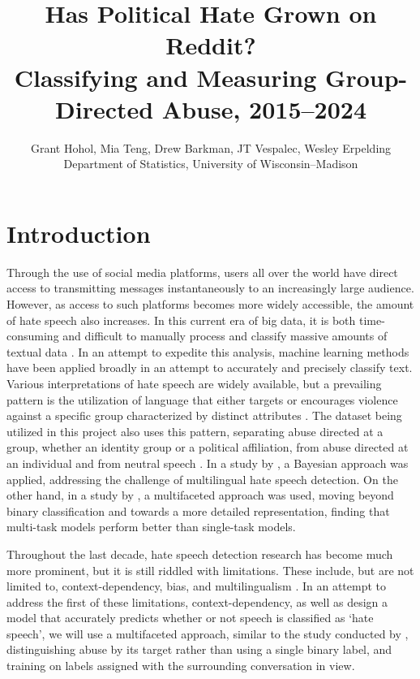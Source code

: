\documentclass{article}
\title{Has Political Hate Grown on Reddit?\\ Classifying and Measuring Group-Directed Abuse, 2015--2024}
\date{}
\author{
  Grant Hohol, Mia Teng, Drew Barkman, JT Vespalec, Wesley Erpelding \\
  Department of Statistics, University of Wisconsin--Madison \\
}
\begin{document}
\maketitle

\section{Introduction}

Through the use of social media platforms, users all over the world have direct access to transmitting messages instantaneously to an increasingly large audience.
However, as access to such platforms becomes more widely accessible, the amount of hate speech also increases.
In this current era of big data, it is both time-consuming and difficult to manually process and classify massive amounts of textual data \citep{mullah2021}.
In an attempt to expedite this analysis, machine learning methods have been applied broadly in an attempt to accurately and precisely classify text.
Various interpretations of hate speech are widely available, but a prevailing pattern is the utilization of language that either targets or encourages violence against a specific group characterized by distinct attributes \citep{rawat2024}.
The dataset being utilized in this project also uses this pattern, separating abuse directed at a group, whether an identity group or a political affiliation, from abuse directed at an individual and from neutral speech \citep{vidgen2021}.
In a study by \citet{miok2022}, a Bayesian approach was applied, addressing the challenge of multilingual hate speech detection.
On the other hand, in a study by \citet{chiril2022}, a multifaceted approach was used, moving beyond binary classification and towards a more detailed representation, finding that multi-task models perform better than single-task models.

Throughout the last decade, hate speech detection research has become much more prominent, but it is still riddled with limitations.
These include, but are not limited to, context-dependency, bias, and multilingualism \citep{gandhi2024}.
In an attempt to address the first of these limitations, context-dependency, as well as design a model that accurately predicts whether or not speech is classified as `hate speech', we will use a multifaceted approach, similar to the study conducted by \citet{chiril2022}, distinguishing abuse by its target rather than using a single binary label, and training on labels assigned with the surrounding conversation in view.
\end{document}
